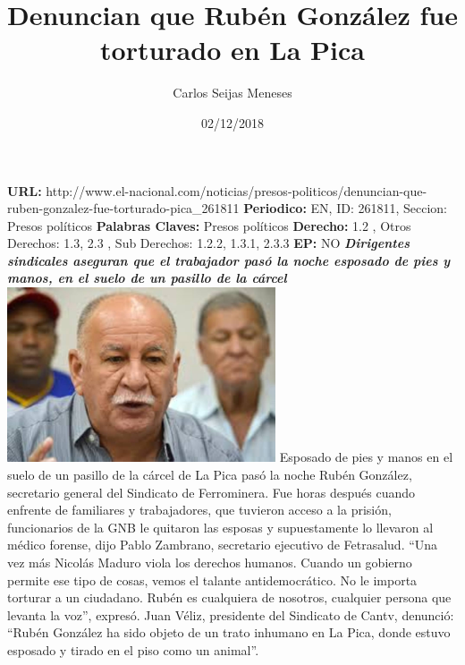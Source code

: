 \documentclass{article}%
\title{\textbf{Denuncian que Rubén González fue torturado en La Pica}}%
\author{Carlos Seijas Meneses}%
\date{02/12/2018}%
\begin{document}
%
\normalsize%
\maketitle%
\textbf{URL: }%
http://www.el{-}nacional.com/noticias/presos{-}politicos/denuncian{-}que{-}ruben{-}gonzalez{-}fue{-}torturado{-}pica\_261811\newline%
%
\textbf{Periodico: }%
EN, %
ID: %
261811, %
Seccion: %
Presos políticos\newline%
%
\textbf{Palabras Claves: }%
Presos políticos\newline%
%
\textbf{Derecho: }%
1.2%
, Otros Derechos: %
1.3, 2.3%
, Sub Derechos: %
1.2.2, 1.3.1, 2.3.3%
\newline%
%
\textbf{EP: }%
NO\newline%
\newline%
%
\textbf{\textit{Dirigentes sindicales aseguran que el trabajador pasó la noche esposado de pies y manos, en el suelo de un pasillo de la cárcel}}%
\newline%
\newline%
%
\includegraphics[width=300px]{187.jpg}%
\newline%
%
Esposado de pies y manos en el suelo de un pasillo de la cárcel de La Pica pasó la noche Rubén González, secretario general del Sindicato de Ferrominera.%
\newline%
%
Fue horas después cuando enfrente de familiares y trabajadores, que tuvieron acceso a la prisión, funcionarios de la GNB le quitaron las esposas y supuestamente lo llevaron al médico forense, dijo Pablo Zambrano, secretario ejecutivo de Fetrasalud. “Una vez más Nicolás Maduro viola los derechos humanos. Cuando un gobierno permite ese tipo de cosas, vemos el talante antidemocrático. No le importa torturar a un ciudadano. Rubén es cualquiera de nosotros, cualquier persona que levanta la voz”, expresó.%
\newline%
%
Juan Véliz, presidente del Sindicato de Cantv, denunció: “Rubén González ha sido objeto de un trato inhumano en La Pica, donde estuvo esposado y tirado en el piso como un animal”.%
\end{document}
